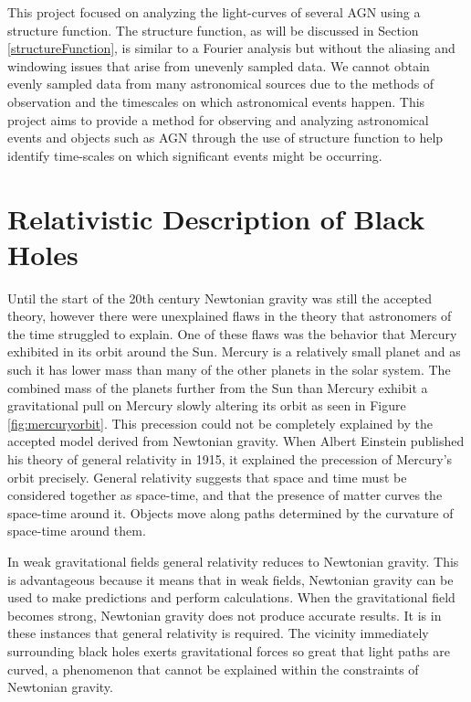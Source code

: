 \documentclass[12pt, oneside]{smuthesis}
\begin{document}
This project focused on analyzing the light-curves of several AGN using a structure function. The structure function, as will be discussed in Section \ref{structureFunction}, is similar to a Fourier analysis but without the aliasing and windowing issues that arise from unevenly sampled data. We cannot obtain evenly sampled data from many astronomical sources due to the methods of observation and the timescales on which astronomical events happen. This project aims to provide a method for observing and analyzing astronomical events and objects such as AGN through the use of structure function to help identify time-scales on which significant events might be occurring.

\chapter{\sc Relativistic Description of Black Holes} \label{generalRelativity}

Until the start of the 20th century Newtonian gravity was still the accepted theory, however there were unexplained flaws in the theory that astronomers of the time struggled to explain. One of these flaws was the behavior that Mercury exhibited in its orbit around the Sun. Mercury is a relatively small planet and as such it has lower mass than many of the other planets in the solar system. The combined mass of the planets further from the Sun than Mercury exhibit a gravitational pull on Mercury slowly altering its orbit as seen in Figure \ref{fig:mercuryorbit}. This precession could not be completely explained by the accepted model derived from Newtonian gravity. When Albert Einstein published his theory of general relativity in 1915, it explained the precession of Mercury's orbit precisely. General relativity suggests that space and time must be considered together as space-time, and that the presence of matter curves the space-time around it. Objects move along paths determined by the curvature of space-time around them.

In weak gravitational fields general relativity reduces to Newtonian gravity. This is advantageous because it means that in weak fields, Newtonian gravity can be used to make predictions and perform calculations. When the gravitational field becomes strong, Newtonian gravity does not produce accurate results. It is in these instances that general relativity is required. The vicinity immediately surrounding black holes exerts gravitational forces so great that light paths are curved, a phenomenon that cannot be explained within the constraints of Newtonian gravity.
\end{document}
